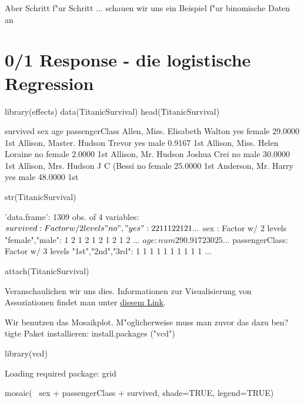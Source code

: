 \documentclass[a4paper,twoside]{tufte-book}\usepackage[]{graphicx}\usepackage[]{color}
\begin{document}
\begin{appendices}
Aber Schritt f"ur Schritt ... schauen wir uns ein Beispiel f"ur binomische Daten an


\section{0/1 Response - die logistische Regression}



\begin{Schunk}
\begin{Sinput}
library(effects) 
data(TitanicSurvival)
head(TitanicSurvival)
\end{Sinput}
\begin{Soutput}
                                survived    sex     age passengerClass
Allen, Miss. Elisabeth Walton        yes female 29.0000            1st
Allison, Master. Hudson Trevor       yes   male  0.9167            1st
Allison, Miss. Helen Loraine          no female  2.0000            1st
Allison, Mr. Hudson Joshua Crei       no   male 30.0000            1st
Allison, Mrs. Hudson J C (Bessi       no female 25.0000            1st
Anderson, Mr. Harry                  yes   male 48.0000            1st
\end{Soutput}
\begin{Sinput}
str(TitanicSurvival)
\end{Sinput}
\begin{Soutput}
'data.frame':	1309 obs. of  4 variables:
 $ survived      : Factor w/ 2 levels "no","yes": 2 2 1 1 1 2 2 1 2 1 ...
 $ sex           : Factor w/ 2 levels "female","male": 1 2 1 2 1 2 1 2 1 2 ...
 $ age           : num  29 0.917 2 30 25 ...
 $ passengerClass: Factor w/ 3 levels "1st","2nd","3rd": 1 1 1 1 1 1 1 1 1 1 ...
\end{Soutput}
\begin{Sinput}
attach(TitanicSurvival)
\end{Sinput}
\end{Schunk}


Veranschaulichen wir uns dies. Informationen zur Visualisierung von Assoziationen findet man unter \href{http://www.statmethods.net/advgraphs/mosaic.html}{diesem Link}.

Wir benutzen das Mosaikplot. M"oglicherweise muss man zuvor das dazu ben?tigte Paket installieren: install.packages ("vcd")

\begin{Schunk}
\begin{Sinput}
library(vcd)
\end{Sinput}
\begin{Soutput}
Loading required package: grid
\end{Soutput}
\begin{Sinput}
mosaic(~ sex + passengerClass + survived, shade=TRUE, legend=TRUE) 
\end{Sinput}


\end{Schunk}
\end{appendices}
\end{document}
